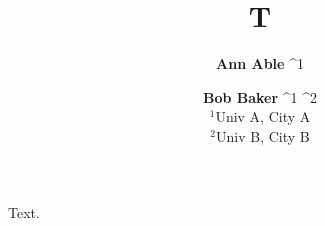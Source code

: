 \documentclass{article}
\begin{document}
\title{T}
\author{\textbf{Ann Able} ^1\footnotemark[1]
\and
\textbf{Bob Baker} ^1 ^2\\
$^1$Univ A, City A\\
$^2$Univ B, City B}
\maketitle
Text.
\end{document}
